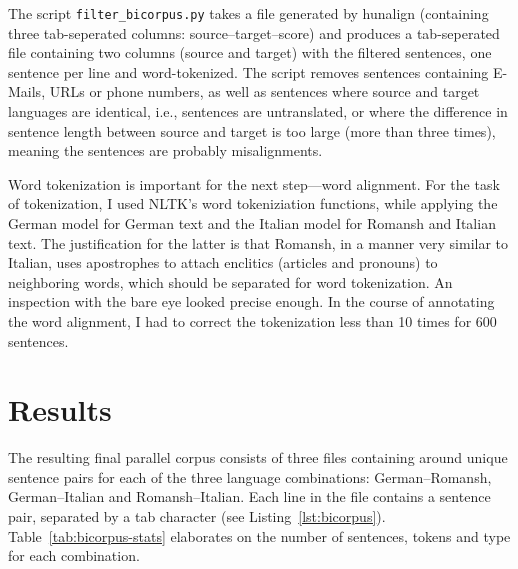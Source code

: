 The script \texttt{filter\_bicorpus.py} takes a file generated by hunalign (containing three tab-seperated columns: source--target--score) and produces a tab-seperated file containing two columns (source and target) with the filtered sentences, one sentence per line and word-tokenized. 
The script removes sentences containing E-Mails, URLs or phone numbers, as well as sentences where source and target languages are identical, i.e., sentences are untranslated, or where the difference in sentence length between source and target is too large (more than three times), meaning the sentences are probably misalignments.

Word tokenization is important for the next step---word alignment. 
For the task of tokenization, I used NLTK's \autocite{bird-2009-nltk} word tokeniziation functions, while applying the German model for German text and the Italian model for Romansh and Italian text. 
The justification for the latter is that Romansh, in a manner very similar to Italian, uses apostrophes to attach enclitics (articles and pronouns) to neighboring words, which should be separated for word tokenization. 
An inspection with the bare eye looked precise enough. 
In the course of annotating the word alignment, I had to correct the tokenization less than 10 times for 600 sentences.


\section{Results}
The resulting final parallel corpus consists of three files containing around  unique sentence pairs for each of the three language combinations: German--Romansh, German--Italian and Romansh--Italian. 
Each line in the file contains a sentence pair, separated by a tab character (see Listing~\ref{lst:bicorpus}). 
Table~\ref{tab:bicorpus-stats} elaborates on the number of sentences, tokens and type for each combination. 


